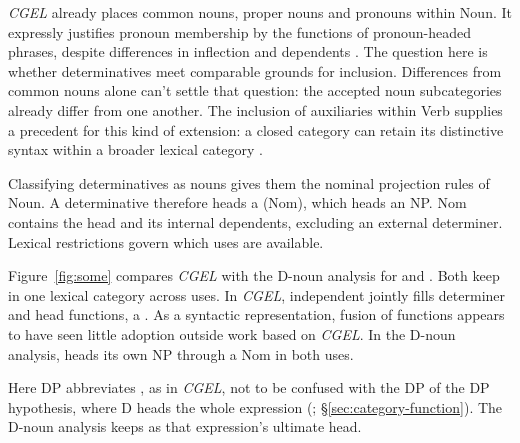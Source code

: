 \documentclass[12pt]{article}
\begin{document}
\textit{CGEL} already places common nouns, proper nouns and pronouns within Noun. It expressly justifies pronoun membership by the functions of pronoun-headed phrases, despite differences in inflection and dependents \citep[327--328]{huddleston2002}. The question here is whether determinatives meet comparable grounds for inclusion. Differences from common nouns alone can't settle that question: the accepted noun subcategories already differ from one another. The inclusion of auxiliaries within Verb supplies a precedent for this kind of extension: a closed category can retain its distinctive syntax within a broader lexical category \citep{pullumwilson1977}.

Classifying determinatives as nouns gives them the nominal projection rules of Noun. A determinative therefore heads a  (Nom), which heads an NP. Nom contains the head and its internal dependents, excluding an external determiner. Lexical restrictions govern which uses are available.

Figure~\ref{fig:some} compares \textit{CGEL} with the D-noun analysis for  and . Both keep  in one lexical category across uses. In \textit{CGEL}, independent  jointly fills determiner and head functions, a  \citep[410--412]{huddleston2002}. As a syntactic representation, fusion of functions appears to have seen little adoption outside work based on \textit{CGEL}. In the D-noun analysis,  heads its own NP through a Nom in both uses.

Here DP abbreviates , as in \textit{CGEL}, not to be confused with the DP of the DP hypothesis, where D heads the whole expression  (\citealp{abney1987}; §\ref{sec:category-function}). The D-noun analysis keeps  as that expression's ultimate head.
\end{document}
